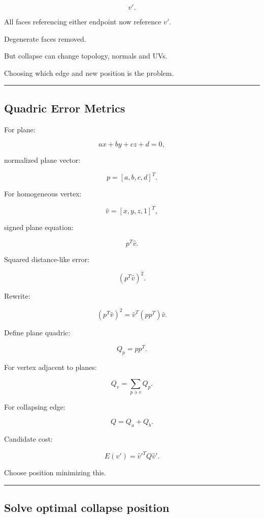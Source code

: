 \[
v'.
\]

All faces referencing either endpoint now reference \(v'\).

Degenerate faces removed.

But collapse can change topology, normals and UVs.

Choosing which edge and new position is the problem.

\begin{center}\rule{0.5\linewidth}{0.5pt}\end{center}

\subsection{Quadric Error Metrics}\label{04-visual-computing-ii-ch041-quadric-error-metrics}

For plane:

\[
ax+by+cz+d=0,
\]

normalized plane vector:

\[
p=
[a,b,c,d]^T.
\]

For homogeneous vertex:

\[
\hat v=
[x,y,z,1]^T,
\]

signed plane equation:

\[
p^T\hat v.
\]

Squared distance-like error:

\[
(p^T\hat v)^2.
\]

Rewrite:

\[
\boxed{
(p^T\hat v)^2
=
\hat v^T
(pp^T)
\hat v.
}
\]

Define plane quadric:

\[
Q_p=pp^T.
\]

For vertex adjacent to planes:

\[
\boxed{
Q_v=
\sum_{p\ni v}
Q_p.
}
\]

For collapsing edge:

\[
Q=
Q_a+Q_b.
\]

Candidate cost:

\[
\boxed{
E(v')
=
\hat v'^TQ\hat v'.
}
\]

Choose position minimizing this.

\begin{center}\rule{0.5\linewidth}{0.5pt}\end{center}

\subsection{Solve optimal collapse position}\label{04-visual-computing-ii-ch041-solve-optimal-collapse-position}

